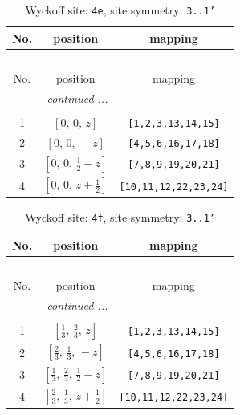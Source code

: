 \documentclass[fleqn,8pt]{jsarticle}
\begin{document}
\begin{longtable}{ccc}
\caption{Wyckoff site: {\tt 4e}, site symmetry: {\tt 3..1'}}
 \\
 \hline \hline
No. & position & mapping \\ \hline \endfirsthead

\multicolumn{2}{l}{\tablename\ \thetable{}} \\
 \hline \hline
No. & position & mapping \\ \hline \endhead

 \hline \hline
\multicolumn{2}{r}{\footnotesize\it continued ...} \\ \endfoot

 \hline \hline
\multicolumn{2}{r}{} \\ \endlastfoot

1 & $\left[ 0,\, 0,\, z \right]$ & {\tt [1,2,3,13,14,15]} \\ \hline
2 & $\left[ 0,\, 0,\, - z \right]$ & {\tt [4,5,6,16,17,18]} \\ \hline
3 & $\left[ 0,\, 0,\, \frac{1}{2} - z \right]$ & {\tt [7,8,9,19,20,21]} \\ \hline
4 & $\left[ 0,\, 0,\, z + \frac{1}{2} \right]$ & {\tt [10,11,12,22,23,24]} \\
\end{longtable}
\renewcommand{\arraystretch}{1.2}
\begin{longtable}{ccc}
\caption{Wyckoff site: {\tt 4f}, site symmetry: {\tt 3..1'}}
 \\
 \hline \hline
No. & position & mapping \\ \hline \endfirsthead

\multicolumn{2}{l}{\tablename\ \thetable{}} \\
 \hline \hline
No. & position & mapping \\ \hline \endhead

 \hline \hline
\multicolumn{2}{r}{\footnotesize\it continued ...} \\ \endfoot

 \hline \hline
\multicolumn{2}{r}{} \\ \endlastfoot

1 & $\left[ \frac{1}{3},\, \frac{2}{3},\, z \right]$ & {\tt [1,2,3,13,14,15]} \\ \hline
2 & $\left[ \frac{2}{3},\, \frac{1}{3},\, - z \right]$ & {\tt [4,5,6,16,17,18]} \\ \hline
3 & $\left[ \frac{1}{3},\, \frac{2}{3},\, \frac{1}{2} - z \right]$ & {\tt [7,8,9,19,20,21]} \\ \hline
4 & $\left[ \frac{2}{3},\, \frac{1}{3},\, z + \frac{1}{2} \right]$ & {\tt [10,11,12,22,23,24]} \\
\end{longtable}
\end{document}

